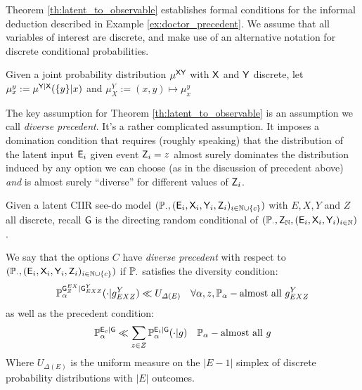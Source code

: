 Theorem \ref{th:latent_to_observable} establishes formal conditions for the informal deduction described in Example \ref{ex:doctor_precedent}. We assume that all variables of interest are discrete, and make use of an alternative notation for discrete conditional probabilities.

\begin{definition}
Given a joint probability distribution $\mu^{\mathsf{XY}}$ with $\mathsf{X}$ and $\mathsf{Y}$ discrete, let $\mu^y_x:=\mu^{\mathsf{Y}|\mathsf{X}}(\{y\}|x)$ and $\mu^Y_X:= (x,y)\mapsto \mu^y_x$
\end{definition}

The key assumption for Theorem \ref{th:latent_to_observable} is an assumption we call \emph{diverse precedent}. It's a rather complicated assumption. It imposes a domination condition that requires (roughly speaking) that the distribution of the latent input $\mathsf{E}_i$ given event $\mathsf{Z}_i=z$ almost surely dominates the distribution induced by any option we can choose (as in the discussion of precedent above) \emph{and} is almost surely ``diverse'' for different values of $\mathsf{Z}_i$.

\begin{definition}\label{def:diverse_precedent}
Given a latent CIIR see-do model $(\mathbb{P}_\cdot,(\mathsf{E}_i,\mathsf{X}_i,\mathsf{Y}_i,\mathsf{Z}_i)_{i\in\mathbb{N}\cup\{c\}})$ with $E,X,Y$ and $Z$ all discrete, recall $\mathsf{G}$ is the directing random conditional of $(\mathbb{P}_\cdot,\mathsf{Z}_{\mathbb{N}},(\mathsf{E}_i,\mathsf{X}_i,\mathsf{Y}_i)_{i\in \mathbb{N}})$. 

We say that the options $C$ have \emph{diverse precedent} with respect to $(\mathbb{P}_\cdot,(\mathsf{E}_i,\mathsf{X}_i,\mathsf{Y}_i,\mathsf{Z}_i)_{i\in\mathbb{N}\cup\{c\}})$ if $\mathbb{P}_\cdot$ satisfies the diversity condition:
\begin{align}
    \mathbb{P}_{\alpha}^{\mathsf{G}^{EX}_{Z}|\mathsf{G}^{Y}_{EXZ}}(\cdot|g^{Y}_{EXZ}) &\ll U_{\Delta(E)}& \forall \alpha, z, \mathbb{P}_\alpha-\text{almost all }g^{Y}_{EXZ}\label{eqApp:lebesgue_dom}
\end{align}
as well as the precedent condition:
\begin{align}
    \mathbb{P}_\alpha^{\mathsf{E}_c|\mathsf{G}} &\ll \sum_{z\in Z}\mathbb{P}_\alpha^{\mathsf{E}_i|\mathsf{G}}(\cdot|g)&\mathbb{P}_\alpha-\text{almost all }g
\end{align}
Where $U_{\Delta(E)}$ is the uniform measure on the $|E-1|$ simplex of discrete probability distributions with $|E|$ outcomes.
\end{definition}

